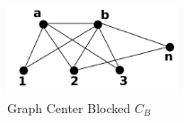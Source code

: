  \begin{figure}[htb]	
 \center%
 \includegraphics[width=5cm]{./img/obstrucaoCentro.png}
 \caption{Graph Center Blocked $C_B$}
\label{fig:obstrucaoCentro}
\end{figure}  
 